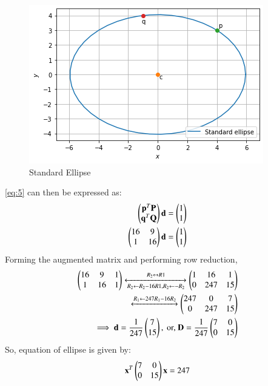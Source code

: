 \documentclass[journal,12pt,twocolumn]{IEEEtran}
\begin{document}
\begin{figure}[!ht]
\centering
\includegraphics[width=\columnwidth]{figure5}
\caption{Standard Ellipse}
\label{fig:ellipse}	
\end{figure}

\eqref{eq:5}
can then be expressed as:
\begin{align}
\begin{pmatrix}\mathbf{p}^T\mathbf{P}\\ \mathbf{q}^T\mathbf{Q}\end{pmatrix}\mathbf{d} &= \begin{pmatrix}1\\1\end{pmatrix}\\
\begin{pmatrix}16 & 9\\ 1 & 16\end{pmatrix}\mathbf{d} &= \begin{pmatrix}1\\1\end{pmatrix}\label{eq:8}
\end{align}
Forming the augmented matrix and performing row reduction,
\begin{align}
\begin{pmatrix}16 & 9 & 1\\ 1 & 16 & 1\end{pmatrix} 
\xleftrightarrow[R_2\leftarrow R_2-16R1,R_2\leftarrow-R_2]{R_2\leftrightarrow R1}
\begin{pmatrix}1 & 16 & 1 \\ 0 & 247 & 15\end{pmatrix} 
\\
\xleftrightarrow[]{R_1\leftarrow 247R_1-16R_2}
\begin{pmatrix}247 & 0 & 7 \\ 0 & 247 & 15\end{pmatrix} 
\\
\implies \mathbf{d} = \frac{1}{247}\begin{pmatrix}7\\15\end{pmatrix}, \text{ or, } \mathbf{D} = \frac{1}{247}\begin{pmatrix}7 & 0 \\ 0 & 15\end{pmatrix}
\end{align}
So, equation of ellipse is given by:
\begin{align}
\label{eq:12}
\mathbf{x}^T\begin{pmatrix}7&0\\0&15\end{pmatrix}\mathbf{x}=247
\end{align}
\end{document}
